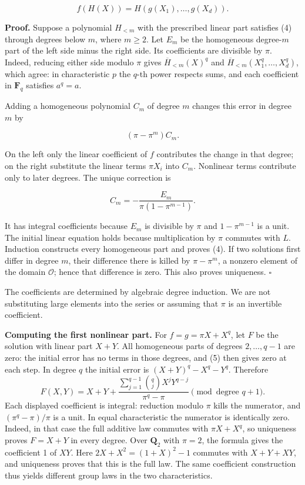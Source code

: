\documentclass[11pt,a4paper]{article}
\begin{document}
\[
f(H(X))=H(g(X_1),\ldots,g(X_d)).
\tag{4}
\]

\textbf{Proof.} Suppose a polynomial \(H_{<m}\) with the prescribed
linear part satisfies (4) through degrees below \(m\), where \(m\geq2\).
Let \(E_m\) be the homogeneous degree-\(m\) part of the left side minus
the right side. Its coefficients are divisible by \(\pi\). Indeed,
reducing either side modulo \(\pi\) gives \(\overline H_{<m}(X)^q\) and
\(\overline H_{<m}(X_1^q,\ldots,X_d^q)\), which agree: in characteristic
\(p\) the \(q\)-th power respects sums, and each coefficient in
\(\mathbf F_q\) satisfies \(a^q=a\).

Adding a homogeneous polynomial \(C_m\) of degree \(m\) changes this
error in degree \(m\) by

\[
(\pi-\pi^m)C_m.
\]

On the left only the linear coefficient of \(f\) contributes the change
in that degree; on the right substitute the linear terms \(\pi X_i\)
into \(C_m\). Nonlinear terms contribute only to later degrees. The
unique correction is

\[
C_m=-\frac{E_m}{\pi(1-\pi^{m-1})}.
\tag{5}
\]

It has integral coefficients because \(E_m\) is divisible by \(\pi\) and
\(1-\pi^{m-1}\) is a unit. The initial linear equation holds because
multiplication by \(\pi\) commutes with \(L\). Induction constructs
every homogeneous part and proves (4). If two solutions first differ in
degree \(m\), their difference there is killed by \(\pi-\pi^m\), a
nonzero element of the domain \(\mathcal O\); hence that difference is
zero. This also proves uniqueness. \(\square\)

The coefficients are determined by algebraic degree induction. We are
not substituting large elements into the series or assuming that \(\pi\)
is an invertible coefficient.

\textbf{Computing the first nonlinear part.} For \(f=g=\pi X+X^q\), let
\(F\) be the solution with linear part \(X+Y\). All homogeneous parts of
degrees \(2,\ldots,q-1\) are zero: the initial error has no terms in
those degrees, and (5) then gives zero at each step. In degree \(q\) the
initial error is \((X+Y)^q-X^q-Y^q\). Therefore \[
F(X,Y)=X+Y+
\frac{\displaystyle\sum_{j=1}^{q-1}\binom qj X^jY^{q-j}}
     {\pi^q-\pi}
\pmod{\text{degree }q+1}.
\] Each displayed coefficient is integral: reduction modulo \(\pi\)
kills the numerator, and \((\pi^q-\pi)/\pi\) is a unit. In equal
characteristic the numerator is identically zero. Indeed, in that case
the full additive law commutes with \(\pi X+X^q\), so uniqueness proves
\(F=X+Y\) in every degree. Over \(\mathbf Q_2\) with \(\pi=2\), the
formula gives the coefficient 1 of \(XY\). Here \(2X+X^2=(1+X)^2-1\)
commutes with \(X+Y+XY\), and uniqueness proves that this is the full
law. The same coefficient construction thus yields different group laws
in the two characteristics.
\end{document}
